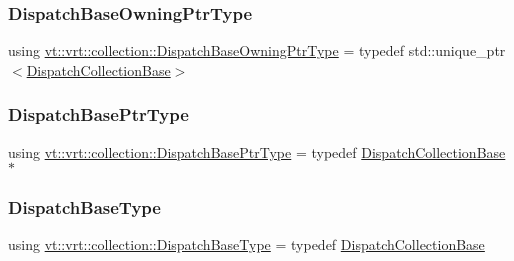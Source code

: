 \subsubsection{\texorpdfstring{Dispatch\+Base\+Owning\+Ptr\+Type}{DispatchBaseOwningPtrType}}
{\footnotesize\ttfamily using \hyperlink{namespacevt_1_1vrt_1_1collection_a124f83d203352b6bccc4f12ca489b68b}{vt\+::vrt\+::collection\+::\+Dispatch\+Base\+Owning\+Ptr\+Type} = typedef std\+::unique\+\_\+ptr$<$\hyperlink{structvt_1_1vrt_1_1collection_1_1_dispatch_collection_base}{Dispatch\+Collection\+Base}$>$}

\mbox{\label{namespacevt_1_1vrt_1_1collection_aa3b9731ae16d60fac43d68840f3606a5}} 
\subsubsection{\texorpdfstring{Dispatch\+Base\+Ptr\+Type}{DispatchBasePtrType}}
{\footnotesize\ttfamily using \hyperlink{namespacevt_1_1vrt_1_1collection_aa3b9731ae16d60fac43d68840f3606a5}{vt\+::vrt\+::collection\+::\+Dispatch\+Base\+Ptr\+Type} = typedef \hyperlink{structvt_1_1vrt_1_1collection_1_1_dispatch_collection_base}{Dispatch\+Collection\+Base}$\ast$}

\mbox{\label{namespacevt_1_1vrt_1_1collection_a9e2462f78f56998464ffc7f35369c70f}} 
\subsubsection{\texorpdfstring{Dispatch\+Base\+Type}{DispatchBaseType}}
{\footnotesize\ttfamily using \hyperlink{namespacevt_1_1vrt_1_1collection_a9e2462f78f56998464ffc7f35369c70f}{vt\+::vrt\+::collection\+::\+Dispatch\+Base\+Type} = typedef \hyperlink{structvt_1_1vrt_1_1collection_1_1_dispatch_collection_base}{Dispatch\+Collection\+Base}}

\mbox{\label{namespacevt_1_1vrt_1_1collection_aecdad7ed4df3be1bab2a6bb9c5945964}} 
